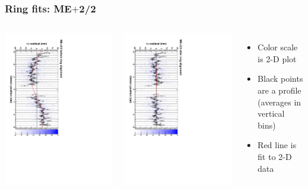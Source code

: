\documentclass[compress]{beamer}
\begin{document}
\begin{frame}
\frametitle{Ring fits: ME$+$2/2}
\vfill
\begin{columns}
\includegraphics[height=\linewidth, angle=90]{ringfits_before/mep22.pdf}

\includegraphics[height=\linewidth, angle=90]{ringfits_after/mep22.pdf}
\begin{itemize}
\item Color scale is 2-D plot
\item Black points are a profile (averages in vertical bins)
\item Red line is fit to 2-D data
\end{itemize}
\end{columns}
\end{frame}
\end{document}
